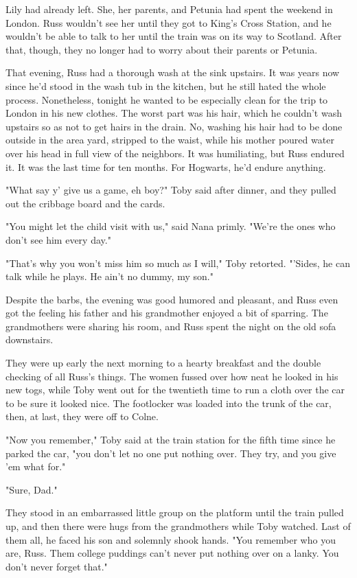 \documentclass[a4paper,11pt]{article}
\begin{document}
Lily had already left. She, her parents, and Petunia had spent the weekend in London. Russ wouldn't see her until they got to King's Cross Station, and he wouldn't be able to talk to her until the train was on its way to Scotland. After that, though, they no longer had to worry about their parents or Petunia.

That evening, Russ had a thorough wash at the sink upstairs. It was years now since he'd stood in the wash tub in the kitchen, but he still hated the whole process. Nonetheless, tonight he wanted to be especially clean for the trip to London in his new clothes. The worst part was his hair, which he couldn't wash upstairs so as not to get hairs in the drain. No, washing his hair had to be done outside in the area yard, stripped to the waist, while his mother poured water over his head in full view of the neighbors. It was humiliating, but Russ endured it. It was the last time for ten months. For Hogwarts, he'd endure anything.

"What say y' give us a game, eh boy?" Toby said after dinner, and they pulled out the cribbage board and the cards.

"You might let the child visit with us," said Nana primly. "We're the ones who don't see him every day."

"That's why you won't miss him so much as I will," Toby retorted. "'Sides, he can talk while he plays. He ain't no dummy, my son."

Despite the barbs, the evening was good humored and pleasant, and Russ even got the feeling his father and his grandmother enjoyed a bit of sparring. The grandmothers were sharing his room, and Russ spent the night on the old sofa downstairs.

They were up early the next morning to a hearty breakfast and the double checking of all Russ's things. The women fussed over how neat he looked in his new togs, while Toby went out for the twentieth time to run a cloth over the car to be sure it looked nice. The footlocker was loaded into the trunk of the car, then, at last, they were off to Colne.

"Now you remember," Toby said at the train station for the fifth time since he parked the car, "you don't let no one put nothing over. They try, and you give 'em what for."

"Sure, Dad."

They stood in an embarrassed little group on the platform until the train pulled up, and then there were hugs from the grandmothers while Toby watched. Last of them all, he faced his son and solemnly shook hands. "You remember who you are, Russ. Them college puddings can't never put nothing over on a lanky. You don't never forget that."
\end{document}
